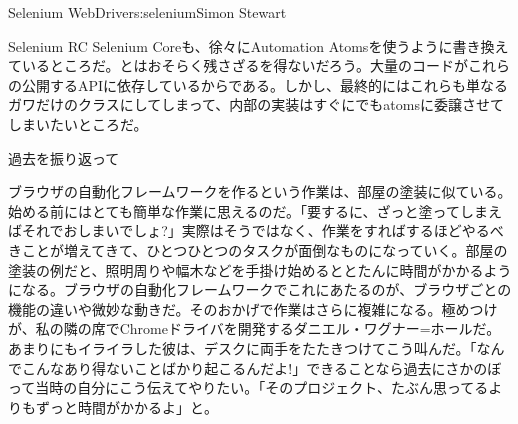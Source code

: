 \begin{aosachapter}{Selenium WebDriver}{s:selenium}{Simon Stewart}
\begin{aosasect1}{Selenium RC}
Selenium Coreも、徐々にAutomation Atomsを使うように書き換えているところだ。とはおそらく残さざるを得ないだろう。大量のコードがこれらの公開するAPIに依存しているからである。しかし、最終的にはこれらも単なるガワだけのクラスにしてしまって、内部の実装はすぐにでもatomsに委譲させてしまいたいところだ。

\end{aosasect1}

\begin{aosasect1}{過去を振り返って}

ブラウザの自動化フレームワークを作るという作業は、部屋の塗装に似ている。始める前にはとても簡単な作業に思えるのだ。「要するに、ざっと塗ってしまえばそれでおしまいでしょ?」実際はそうではなく、作業をすればするほどやるべきことが増えてきて、ひとつひとつのタスクが面倒なものになっていく。部屋の塗装の例だと、照明周りや幅木などを手掛け始めるととたんに時間がかかるようになる。ブラウザの自動化フレームワークでこれにあたるのが、ブラウザごとの機能の違いや微妙な動きだ。そのおかげで作業はさらに複雑になる。極めつけが、私の隣の席でChromeドライバを開発するダニエル・ワグナー=ホールだ。あまりにもイライラした彼は、デスクに両手をたたきつけてこう叫んだ。「なんでこんなあり得ないことばかり起こるんだよ!」できることなら過去にさかのぼって当時の自分にこう伝えてやりたい。「そのプロジェクト、たぶん思ってるよりもずっと時間がかかるよ」と。


\end{aosasect1}
\end{aosachapter}
